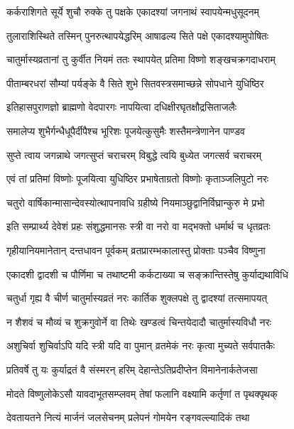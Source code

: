 \twolineshloka
{कर्कराशिगते सूर्ये शुचौ रुक्के तु पक्षके}
{एकादश्यां जगनाथं स्वापयेन्मधुसूदनम्} %

\twolineshloka
{तुलाराशिस्थिते तस्मिन् पुनरुत्थापयेद्धरिम्}
{आषाढल्य सिते पक्षे एकादश्यामुपोषितः} %

\twolineshloka
{चातुर्मास्यव्रतानां तु कुर्वीत नियमं ततः}
{स्थापयेत् प्रतिमा विष्णो शङ्खचक्रगदाधराम्} %

\twolineshloka
{पीताम्बरधरां सौम्यां पर्यङ्के वै सिते शुभे}
{सितवस्त्रसमाच्छन्ने सोपधाने युधिष्ठिर} %

\twolineshloka
{इतिहासपुराणज्ञो ब्राह्मणो वेदपारगः}
{नापयित्वा दधिक्षीरघृतक्षौद्रसिताजलैः} %

\twolineshloka
{समालेप्य शुभैर्गन्धैधूपैर्दीपैश्च भूरिशः}
{पूजयेत्कुसुमैः शस्तैमन्त्रेणानेन पाण्डव} %

\twolineshloka
{सुप्ते त्वाय जगन्नाथे जगत्सुप्तं चराचरम्}
{विबुद्धे त्वयि बुध्येत जगत्सर्व चराचरम्} %

\twolineshloka
{एवं तां प्रतिमां विष्णोः पूजयित्वा युधिष्ठिर}
{प्रभाषेताग्रतो विष्णोः कृताञ्जलिपुटो नरः} %

\twolineshloka
{चतुरो वार्षिकान्मासान्देवस्योत्थापनावधि}
{ग्रहीष्ये नियमाञ्छुद्वानिर्विघ्रान्कुरु मे प्रभो} %

\twolineshloka
{इति सम्प्रार्थ्य देवेशं प्रहः संशुद्धमानसः}
{स्त्री वा नरो वा मद्भक्तो धर्मार्थ च धृतव्रतः} %

\twolineshloka
{गृहीयानियमानेतान् दन्तधावन पूर्वकम्}
{व्रतप्रारम्भकालास्तु प्रोक्ताः पञ्चैव विष्णुना} %

\twolineshloka
{एकादशी द्वादशी च पौर्णिमा च तथाष्टमी}
{कर्कटाख्या च सङ्क्रान्तिस्तेषु कुर्याद्यथाविधि} %

\twolineshloka
{चतुर्धा गृह्य वै चीर्ण चातुर्मास्यव्रतं नरः}
{कार्तिक शुक्लपक्षे तु द्वादश्यां तत्समापयत्} %

\twolineshloka
{न शैशवं च मौव्यं च शुक्रगुवोर्ने वा तिथेः}
{खण्डत्वं चिन्तयेदादौ चातुर्मास्यविधौ नरः} %

\twolineshloka
{अशुचिर्वा शुचिर्वाऽपि यदि स्त्री यदि वा पुमान्}
{व्रतमेकं नरः कृत्वा मुच्यते सर्वपातकैः} %

\twolineshloka
{प्रतिवर्षे तु यः कुर्याद्रतं वै संस्मरन् हरिम्}
{देहान्तेऽतिप्रदीप्तेन विमानेनार्कतेजसा} %

\twolineshloka
{मोदते विष्णुलोकेऽसौ यावदाभूतसम्प्लवम्}
{तेषां फलानि वक्ष्यामि कर्तृणां त पृथक्पृथक्} %

\twolineshloka
{देवतायतने नित्यं मार्जनं जलसेचनम्}
{प्रलेपनं गोमयेन रङ्गवल्ल्यादिकं तथा} %

